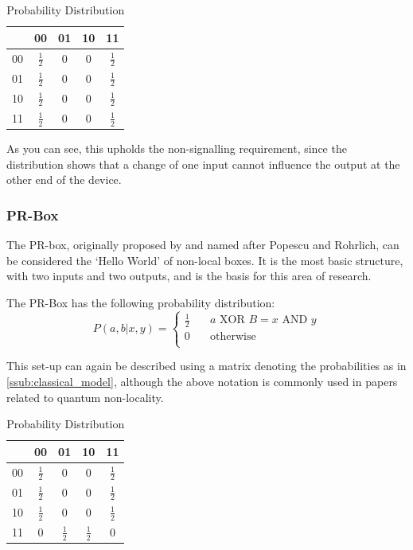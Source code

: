 \documentclass[report.tex]{subfiles}
\begin{document}
\begin{table}[H]
  \centering
  \begin{tabular}{l | c c c c}
	  & 00 & 01 & 10 & 11 \\
	  \hline
	  00 & \(\frac{1}{2}\) & 0 & 0 & \(\frac{1}{2}\) \\
	  01 & \(\frac{1}{2}\) & 0 & 0 & \(\frac{1}{2}\) \\
	  10 & \(\frac{1}{2}\) & 0 & 0 & \(\frac{1}{2}\) \\
	  11 & \(\frac{1}{2}\) & 0 & 0 & \(\frac{1}{2}\) \\
  \end{tabular}
  \caption{Probability Distribution}
  \label{tab:classical}
\end{table}

As you can see, this upholds the non-signalling requirement, since the
distribution shows that a change of one input cannot influence the output at the
other end of the device. 

\subsubsection{PR-Box} %
\label{ssub:pr_box}
The PR-box, originally proposed by and named after Popescu and Rohrlich, can be
considered the `Hello World' of non-local boxes. It is the most basic structure,
with two inputs and two outputs, and is the basis for this area of research.

The PR-Box has the following probability distribution:
\[
	P(a, b | x, y) = 
	\begin{cases}
		\frac{1}{2} & \quad a \text{ XOR } B = x \text{ AND } y \\
		0 & \quad \text{otherwise} \\
	\end{cases}
\]

This set-up can again be described using a matrix denoting the probabilities as
in \ref{ssub:classical_model}, although the above notation is commonly used in
papers related to quantum non-locality.

\begin{table}[H]
  \centering
\begin{tabular}{l | c c c c}
  & 00 & 01 & 10 & 11 \\
  \hline
  00 & \(\frac{1}{2}\) & 0 & 0 & \(\frac{1}{2}\) \\
  01 & \(\frac{1}{2}\) & 0 & 0 & \(\frac{1}{2}\) \\
  10 & \(\frac{1}{2}\) & 0 & 0 & \(\frac{1}{2}\) \\
  11 & 0 & \(\frac{1}{2}\) & \(\frac{1}{2}\) & 0 \\
\end{tabular}
  \caption{Probability Distribution}
  \label{tab:pr}
\end{table}
\end{document}
